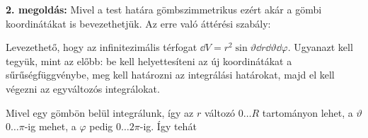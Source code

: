  {\textbf{ 2. megoldás:}} Mivel a test határa gömbszimmetrikus ezért akár a gömbi koordinátákat is bevezethetjük. Az erre való áttérési szabály:
 
 Levezethető, hogy az infinitezimális térfogat $\dd V=r^2\sin\vartheta\dd r\dd\vartheta\dd\varphi$. Ugyanazt kell tegyük, mint az előbb: be kell helyettesíteni az új koordinátákat a sűrűségfüggvénybe, meg kell határozni az integrálási határokat, majd el kell végezni az egyváltozós integrálokat. 
 
 Mivel egy gömbön belül integrálunk, így az $r$ változó $0\dots R$ tartományon lehet, a $\vartheta$ $0\dots\pi$-ig mehet, a $\varphi$ pedig $0\dots 2\pi$-ig. Így tehát
 
